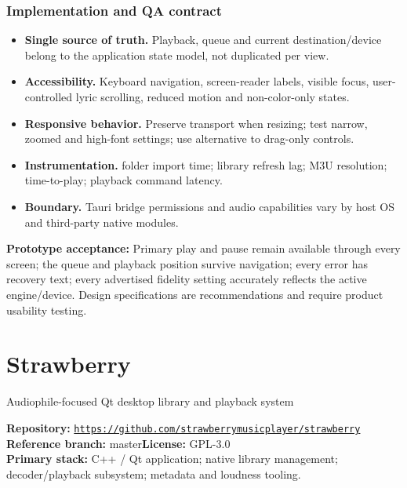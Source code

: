 \documentclass[10pt,a4paper,oneside]{report}
\newcommand{\sourceurl}[1]{\href{#1}{\texttt{\nolinkurl{#1}}}}
\begin{document}
\subsection*{Implementation and QA contract}
\begin{itemize}[leftmargin=*,itemsep=2pt,topsep=2pt]
\item \textbf{Single source of truth.} Playback, queue and current destination/device belong to the application state model, not duplicated per view.
\item \textbf{Accessibility.} Keyboard navigation, screen-reader labels, visible focus, user-controlled lyric scrolling, reduced motion and non-color-only states.
\item \textbf{Responsive behavior.} Preserve transport when resizing; test narrow, zoomed and high-font settings; use alternative to drag-only controls.
\item \textbf{Instrumentation.} folder import time; library refresh lag; M3U resolution; time-to-play; playback command latency.
\item \textbf{Boundary.} Tauri bridge permissions and audio capabilities vary by host OS and third-party native modules.
\end{itemize}
\vspace{2mm}\begin{evidencebox}\small\textbf{Prototype acceptance:} Primary play and pause remain available through every screen; the queue and playback position survive navigation; every error has recovery text; every advertised fidelity setting accurately reflects the active engine/device. Design specifications are recommendations and require product usability testing.\end{evidencebox}
\clearpage
\chapter{Strawberry}
{\large\color{muted}Audiophile-focused Qt desktop library and playback system}\par
\begin{evidencebox}\small\textbf{Repository:} \sourceurl{https://github.com/strawberrymusicplayer/strawberry}\\\textbf{Reference branch:} master\qquad \textbf{License:} GPL-3.0\\\textbf{Primary stack:} C++ / Qt application; native library management; decoder/playback subsystem; metadata and loudness tooling.\end{evidencebox}
\end{document}
